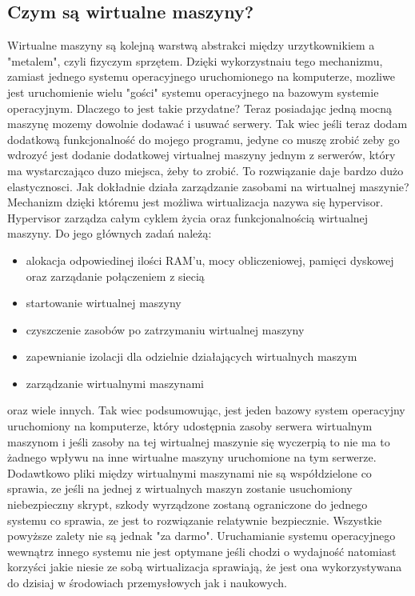 \subsection{Czym są wirtualne maszyny?}
Wirtualne maszyny są kolejną warstwą abstrakci między urzytkownikiem a "metalem", czyli fizyczym sprzętem. Dzięki wykorzystnaiu tego mechanizmu, zamiast jednego systemu operacyjnego uruchomionego na komputerze, mozliwe jest uruchomienie wielu "gości" systemu operacyjnego na bazowym systemie operacyjnym. Dlaczego to jest takie przydatne? Teraz posiadając jedną mocną maszynę mozemy dowolnie dodawać i usuwać serwery. Tak wiec jeśli  teraz dodam dodatkową funkcjonalność do mojego programu, jedyne co muszę zrobić zeby go wdrozyć jest dodanie dodatkowej virtualnej maszyny jednym z serwerów, który ma wystarczająco duzo miejsca, żeby to zrobić. To rozwiązanie daje bardzo dużo elastycznosci. 
Jak dokładnie działa zarządzanie zasobami na wirtualnej maszynie?
Mechanizm dzięki któremu jest możliwa wirtualizacja nazywa się hypervisor. Hypervisor zarządza całym cyklem życia oraz funkcjonalnością wirtualnej maszyny. 
Do jego głównych zadań należą:
\begin{itemize}
    \item alokacja odpowiedinej ilości RAM'u, mocy obliczeniowej, pamięci dyskowej oraz zarządanie połączeniem z siecią
    \item startowanie wirtualnej maszyny 
    \item czyszczenie zasobów po zatrzymaniu wirtualnej maszyny
    \item zapewnianie izolacji dla odzielnie działających wirtualnych maszym 
    \item zarządzanie wirtualnymi maszynami
\end{itemize}
oraz wiele innych. 
Tak wiec podsumowując, jest jeden bazowy system operacyjny uruchomiony na komputerze, który udostępnia zasoby serwera wirtualnym maszynom i jeśli zasoby na tej wirtualnej maszynie się wyczerpią to nie ma to żadnego wpływu na inne wirtualne maszyny uruchomione na tym serwerze. Dodawtkowo pliki między wirtualnymi maszynami nie są współdzielone co sprawia, ze jeśli na jednej z wirtualnych maszyn zostanie usuchomiony niebezpieczny skrypt, szkody wyrządzone zostaną ograniczone do jednego systemu co sprawia, ze jest to rozwiązanie relatywnie bezpiecznie.
Wszystkie powyższe zalety nie są jednak "za darmo". Uruchamianie systemu operacyjnego wewnątrz innego systemu nie jest optymane jeśli chodzi o wydajność natomiast korzyści jakie niesie ze sobą wirtualizacja sprawiają, że jest ona wykorzystywana do dzisiaj w środowiach przemysłowych jak i naukowych. 
